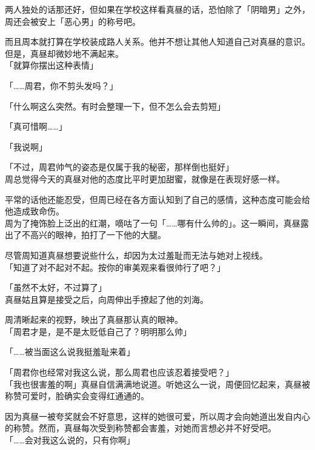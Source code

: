 两人独处的话那还好，但如果在学校这样看真昼的话，恐怕除了「阴暗男」之外，周还会被安上「恶心男」的称号吧。

而且周本就打算在学校装成路人关系。他并不想让其他人知道自己对真昼的意识。\\

但是，真昼却微妙地不满起来。\\

「就算你摆出这种表情」

「……周君，你不剪头发吗？」

「什么啊这么突然。有时会整理一下，但不怎么会去剪短」

「真可惜啊……」

「我说啊」

「不过，周君帅气的姿态是仅属于我的秘密，那样倒也挺好」\\

周总觉得今天的真昼对他的态度比平时更加甜蜜，就像是在表现好感一样。

平常的话他还能忍受，但周已经在各方面认知到了自己的感情，这种态度可能会给他造成致命伤。\\

周为了掩饰脸上泛出的红潮，嘀咕了一句「……哪有什么帅的」。这一瞬间，真昼露出了不高兴的眼神，拍打了一下他的大腿。

尽管周知道真昼想要说些什么，却因为太过羞耻而无法与她对上视线。\\

「知道了对不起对不起。按你的审美观来看很帅行了吧？」

「虽然不太好，不过算了」\\

真昼姑且算是接受之后，向周伸出手撩起了他的刘海。

周清晰起来的视野，映出了真昼那认真的眼神。\\

「周君才是，是不是太贬低自己了？明明那么帅」

「……被当面这么说我挺羞耻来着」

「周君你也经常对我这么说，那么周君也应该忍着接受吧？」\\

「我也很害羞的啊」真昼自信满满地说道。听她这么一说，周便回忆起来，真昼被称赞可爱时，脸确实会变得红通通的。

因为真昼一被夸奖就会不好意思，这样的她很可爱，所以周才会向她道出发自内心的称赞。然而，真昼每次受到称赞都会害羞，对她而言想必并不好受吧。\\

「……会对我这么说的，只有你啊」

